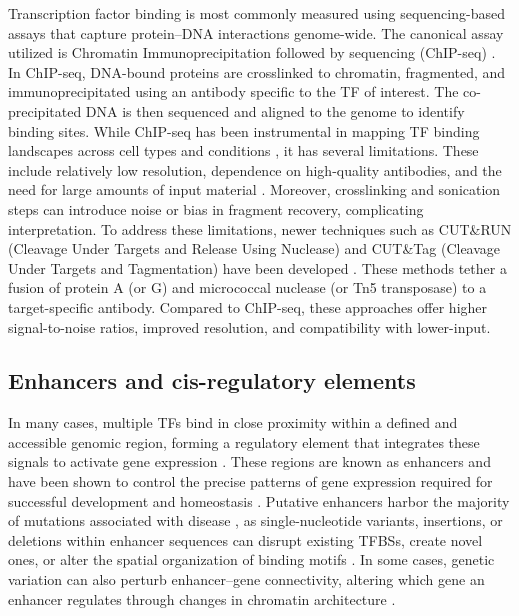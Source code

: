 \begin{dissertationintroduction}
Transcription factor binding is most commonly measured using sequencing-based assays that capture protein–DNA interactions genome-wide. The canonical assay utilized is Chromatin Immunoprecipitation followed by sequencing (ChIP-seq) \cite{Johnson2007-pz}. In ChIP-seq, DNA-bound proteins are crosslinked to chromatin, fragmented, and immunoprecipitated using an antibody specific to the TF of interest. The co-precipitated DNA is then sequenced and aligned to the genome to identify binding sites. While ChIP-seq has been instrumental in mapping TF binding landscapes across cell types and conditions \cite{ENCODE_Project_Consortium2020-ns}, it has several limitations. These include relatively low resolution, dependence on high-quality antibodies, and the need for large amounts of input material \cite{Park2009-gj}. Moreover, crosslinking and sonication steps can introduce noise or bias in fragment recovery, complicating interpretation. To address these limitations, newer techniques such as CUT\&RUN (Cleavage Under Targets and Release Using Nuclease) and CUT\&Tag (Cleavage Under Targets and Tagmentation) have been developed \cite{Kaya-Okur2019-yz,Skene2017-vk}. These methods tether a fusion of protein A (or G) and micrococcal nuclease (or Tn5 transposase) to a target-specific antibody. Compared to ChIP-seq, these approaches offer higher signal-to-noise ratios, improved resolution, and compatibility with lower-input.

\subsection{Enhancers and cis-regulatory elements}

In many cases, multiple TFs bind in close proximity within a defined and accessible genomic region, forming a regulatory element that integrates these signals to activate gene expression \cite{Spitz2012-la}. These regions are known as enhancers and have been shown to control the precise patterns of gene expression required for successful development and homeostasis \cite{Levine2010-ry}. Putative enhancers harbor the majority of mutations associated with disease \cite{Zaugg2022-ar,Maurano2012-cg,Tak2015-km}, as single-nucleotide variants, insertions, or deletions within enhancer sequences can disrupt existing TFBSs, create novel ones, or alter the spatial organization of binding motifs \cite{Lim2024-ph,Zaugg2022-ar,noauthor_2023-va}. In some cases, genetic variation can also perturb enhancer–gene connectivity, altering which gene an enhancer regulates through changes in chromatin architecture \cite{Mortenson2024-tn}.


\end{dissertationintroduction}
